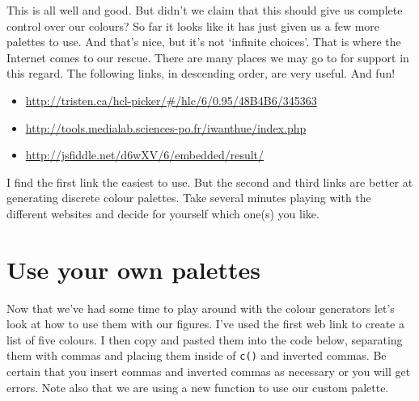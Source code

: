 \documentclass[]{book}
\newenvironment{Shaded}{\begin{snugshade}}{\end{snugshade}}
\newcommand{\KeywordTok}[1]{\textcolor[rgb]{0.13,0.29,0.53}{\textbf{#1}}}
\newcommand{\DataTypeTok}[1]{\textcolor[rgb]{0.13,0.29,0.53}{#1}}
\newcommand{\StringTok}[1]{\textcolor[rgb]{0.31,0.60,0.02}{#1}}
\newcommand{\OperatorTok}[1]{\textcolor[rgb]{0.81,0.36,0.00}{\textbf{#1}}}
\newcommand{\NormalTok}[1]{#1}
\providecommand{\tightlist}{%
  \setlength{\itemsep}{0pt}\setlength{\parskip}{0pt}}
\theoremstyle{definition}
\theoremstyle{definition}
\theoremstyle{definition}
\theoremstyle{remark}
\begin{document}
This is all well and good. But didn't we claim that this should give us
complete control over our colours? So far it looks like it has just
given us a few more palettes to use. And that's nice, but it's not
`infinite choices'. That is where the Internet comes to our rescue.
There are many places we may go to for support in this regard. The
following links, in descending order, are very useful. And fun!

\begin{itemize}
\tightlist
\item
  \url{http://tristen.ca/hcl-picker/\#/hlc/6/0.95/48B4B6/345363}
\item
  \url{http://tools.medialab.sciences-po.fr/iwanthue/index.php}
\item
  \url{http://jsfiddle.net/d6wXV/6/embedded/result/}
\end{itemize}

I find the first link the easiest to use. But the second and third links
are better at generating discrete colour palettes. Take several minutes
playing with the different websites and decide for yourself which one(s)
you like.

\section{Use your own palettes}\label{use-your-own-palettes}

Now that we've had some time to play around with the colour generators
let's look at how to use them with our figures. I've used the first web
link to create a list of five colours. I then copy and pasted them into
the code below, separating them with commas and placing them inside of
\texttt{c()} and inverted commas. Be certain that you insert commas and
inverted commas as necessary or you will get errors. Note also that we
are using a new function to use our custom palette.

\begin{Shaded}
\end{Shaded}
\end{document}
